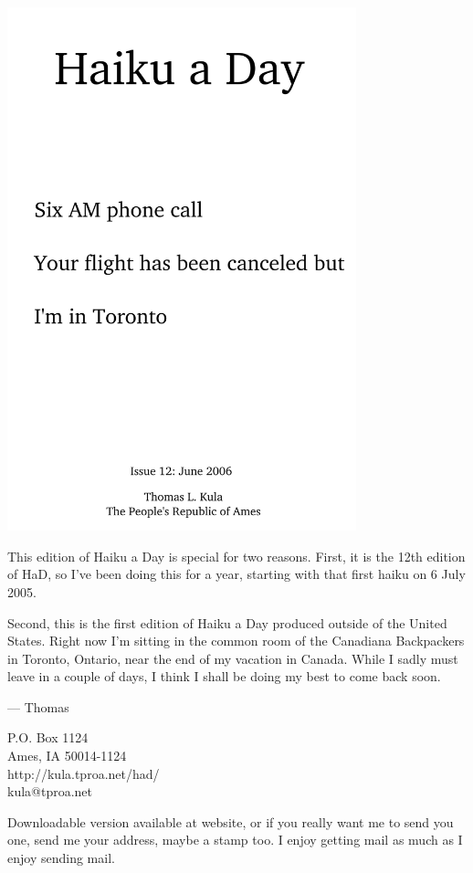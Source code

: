\documentclass[12pt]{article}
\begin{document}
\includegraphics[width=101mm]{frontpage.png}

\newpage

This edition of Haiku a Day is special for two reasons.
First, it is the 12th edition of HaD, so I've been doing
this for a year, starting with that first haiku on 6 July
2005.

Second, this is the first edition of Haiku a Day produced
outside of the United States. Right now I'm sitting in
the common room of the Canadiana Backpackers in Toronto,
Ontario, near the end of my vacation in Canada. While I
sadly must leave in a couple of days, I think I shall be
doing my best to come back soon.

--- Thomas

P.O. Box 1124 \\
Ames, IA 50014-1124 \\
http://kula.tproa.net/had/ \\
kula@tproa.net

Downloadable version available at website, or if you really
want me to send you one, send me your address, maybe a
stamp too. I enjoy getting mail as much as I enjoy sending
mail.\\
\end{document}
